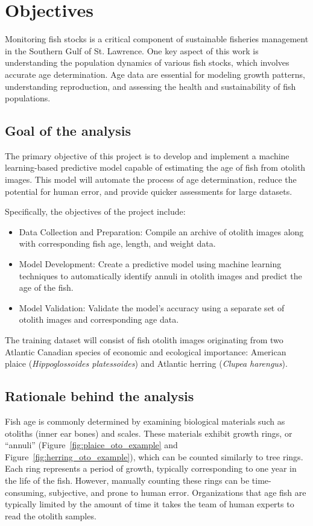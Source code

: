 
\section{Objectives}

Monitoring fish stocks is a critical component of sustainable fisheries management in the Southern Gulf of St. Lawrence.
One key aspect of this work is understanding the population dynamics of various fish stocks, which involves accurate age determination.
Age data are essential for modeling growth patterns, understanding reproduction, and assessing the health and sustainability of fish populations.

\subsection{Goal of the analysis}

The primary objective of this project is to develop and implement a machine learning-based predictive model capable of estimating the age of fish from otolith images.
This model will automate the process of age determination, reduce the potential for human error, and provide quicker assessments for large datasets.

Specifically, the objectives of the project include:

\begin{itemize}
    \item Data Collection and Preparation: Compile an archive of otolith images along with corresponding fish age, length, and weight data.
    \item Model Development: Create a predictive model using machine learning techniques to automatically identify annuli in otolith images and predict the age of the fish.
    \item Model Validation: Validate the model's accuracy using a separate set of otolith images and corresponding age data.
\end{itemize}

The training dataset will consist of fish otolith images originating from two Atlantic Canadian species of economic and ecological importance:
American plaice (\textit{Hippoglossoides platessoides}) and Atlantic herring (\textit{Clupea harengus}).


\subsection{Rationale behind the analysis}

Fish age is commonly determined by examining biological materials such as otoliths (inner ear bones) and scales.
These materials exhibit growth rings, or \enquote{annuli} (Figure~\ref{fig:plaice_oto_example} and Figure~\ref{fig:herring_oto_example}), which can be counted similarly to tree rings.
Each ring represents a period of growth, typically corresponding to one year in the life of the fish.
However, manually counting these rings can be time-consuming, subjective, and prone to human error.
Organizations that age fish are typically limited by the amount of time it takes the team of human experts to read the otolith samples.

